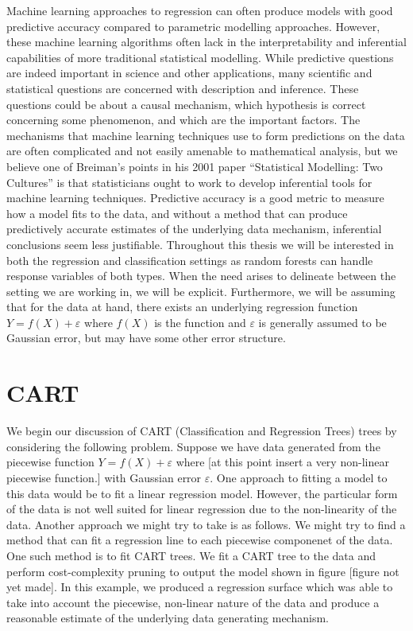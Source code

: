 \documentclass[12pt,twoside]{reedthesis}
\theoremstyle{definition}
\theoremstyle{definition}
\theoremstyle{definition}
\theoremstyle{remark}
\begin{document}
Machine learning approaches to regression can often produce models with
good predictive accuracy compared to parametric modelling approaches.
However, these machine learning algorithms often lack in the
interpretability and inferential capabilities of more traditional
statistical modelling. While predictive questions are indeed important
in science and other applications, many scientific and statistical
questions are concerned with description and inference. These questions
could be about a causal mechanism, which hypothesis is correct
concerning some phenomenon, and which are the important factors. The
mechanisms that machine learning techniques use to form predictions on
the data are often complicated and not easily amenable to mathematical
analysis, but we believe one of Breiman's points in his 2001 paper
``Statistical Modelling: Two Cultures'' is that statisticians ought to
work to develop inferential tools for machine learning techniques.
Predictive accuracy is a good metric to measure how a model fits to the
data, and without a method that can produce predictively accurate
estimates of the underlying data mechanism, inferential conclusions seem
less justifiable. Throughout this thesis we will be interested in both
the regression and classification settings as random forests can handle
response variables of both types. When the need arises to delineate
between the setting we are working in, we will be explicit. Furthermore,
we will be assuming that for the data at hand, there exists an
underlying regression function \(Y=f(X)+\varepsilon\) where \(f(X)\) is
the function and \(\varepsilon\) is generally assumed to be Gaussian
error, but may have some other error structure.

\section{CART}\label{cart}

We begin our discussion of CART (Classification and Regression Trees)
trees by considering the following problem. Suppose we have data
generated from the piecewise function \(Y=f(X)+\varepsilon\) where {[}at
this point insert a very non-linear piecewise function.{]} with Gaussian
error \(\varepsilon\). One approach to fitting a model to this data
would be to fit a linear regression model. However, the particular form
of the data is not well suited for linear regression due to the
non-linearity of the data. Another approach we might try to take is as
follows. We might try to find a method that can fit a regression line to
each piecewise componenet of the data. One such method is to fit CART
trees. We fit a CART tree to the data and perform cost-complexity
pruning to output the model shown in figure {[}figure not yet made{]}.
In this example, we produced a regression surface which was able to take
into account the piecewise, non-linear nature of the data and produce a
reasonable estimate of the underlying data generating mechanism.
\end{document}
